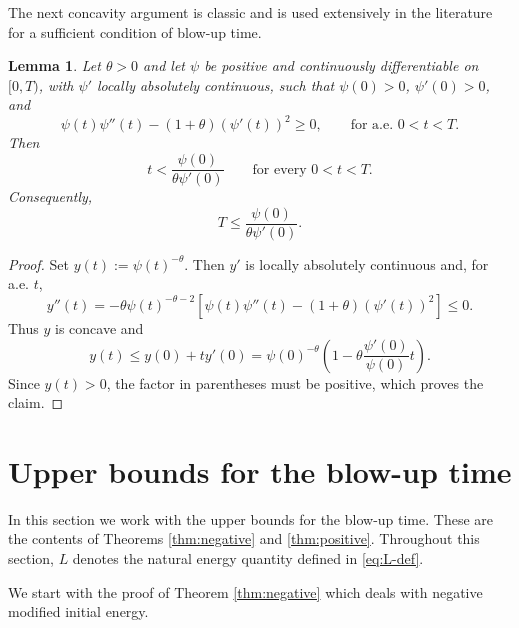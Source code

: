 \documentclass[12pt,reqno]{amsart}
\newtheorem{lemma}[theorem]{Lemma}
\theoremstyle{definition}
\theoremstyle{remark}
\numberwithin{equation}{section}
\begin{document}
The next concavity argument is classic and is used extensively in the literature for a sufficient condition of blow-up time.


\begin{lemma} \label{lem:concavity}
	Let $\theta>0$ and let $\psi$ be positive and continuously differentiable on $[0,T)$, with $\psi'$ locally absolutely continuous, such that
	$\psi(0)>0$, $\psi'(0)>0$, and
	\[
	\psi(t)\psi''(t)-(1+\theta)(\psi'(t))^2\ge0,
	\qquad \text{for a.e. }0<t<T.
	\]
	Then
	\[
	t<\frac{\psi(0)}{\theta\psi'(0)}
	\qquad\text{for every }0<t<T.
	\]
	Consequently,
	\[
	T\le\frac{\psi(0)}{\theta\psi'(0)}.
	\]
\end{lemma}
\begin{proof}
	Set $y(t):=\psi(t)^{-\theta}$. Then $y'$ is locally absolutely continuous and, for a.e. $t$,
	\[
	y''(t)
	=-\theta\psi(t)^{-\theta-2}
	\left[\psi(t)\psi''(t)-(1+\theta)(\psi'(t))^2\right]\le0.
	\]
	Thus $y$ is concave and
	\[
	y(t)\le y(0)+t y'(0)
	=\psi(0)^{-\theta}
	\left(1-\theta\frac{\psi'(0)}{\psi(0)}t\right).
	\]
	Since $y(t)>0$, the factor in parentheses must be positive, which proves the claim.
\end{proof}






\section{Upper bounds for the blow-up time} \label{sec:upper}


In this section we work with the upper bounds for the blow-up time.
These are the contents of Theorems \ref{thm:negative} and \ref{thm:positive}.
Throughout this section, $L$ denotes the natural energy quantity defined in \eqref{eq:L-def}.


We start with the proof of Theorem \ref{thm:negative} which deals with negative modified initial energy.
\end{document}
